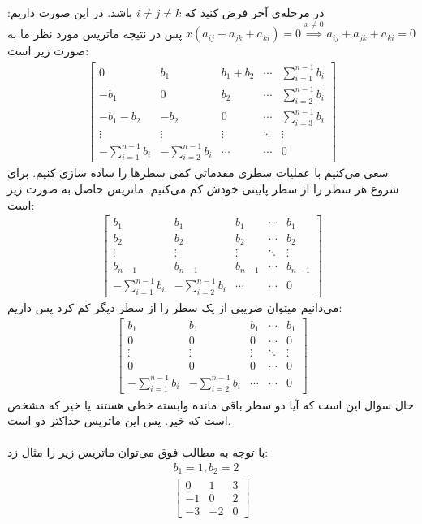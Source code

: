 \noindent
در مرحله‌ی آخر فرض کنید که
$i \neq j \neq k$
باشد. در این صورت داریم:
$x (a_{ij} + a_{jk} + a_{ki}) = 0 \stackrel{x \neq 0}{\implies} a_{ij} + a_{jk} + a_{ki} = 0$
پس در نتیجه ماتریس مورد نظر ما به صورت زیر است:
\begin{gather*}
    \begin{bmatrix}
        0 & b_1 & b_1 + b_2 & \cdots & \sum_{i=1}^{n-1} b_i \\
        -b_1 & 0 & b_2 & \cdots & \sum_{i=2}^{n-1} b_i\\
        -b_1 - b_2 & -b_2 & 0 & \cdots & \sum_{i=3}^{n-1} b_i\\
        \vdots & \vdots & \vdots & \ddots & \vdots\\
        -\sum_{i=1}^{n-1} b_i & -\sum_{i=2}^{n-1} b_i & \cdots & \cdots & 0
    \end{bmatrix}
\end{gather*}
سعی می‌کنیم با عملیات سطری مقدماتی کمی سطر‌ها را ساده سازی کنیم.
برای شروع هر سطر را از سطر پایینی خودش کم می‌کنیم. ماتریس حاصل به صورت زیر است:
\begin{gather*}
    \begin{bmatrix}
        b_1 & b_1 & b_1 & \cdots & b_1 \\
        b_2 & b_2 & b_2 & \cdots & b_2 \\
        \vdots & \vdots & \vdots & \ddots & \vdots\\
        b_{n-1} & b_{n-1} & b_{n-1} & \cdots & b_{n-1}\\
        -\sum_{i=1}^{n-1} b_i & -\sum_{i=2}^{n-1} b_i & \cdots & \cdots & 0
    \end{bmatrix}
\end{gather*}
می‌دانیم میتوان ضریبی از یک سطر را از سطر دیگر کم کرد پس داریم:
\begin{gather*}
    \begin{bmatrix}
        b_1 & b_1 & b_1 & \cdots & b_1 \\
        0 & 0 & 0 & \cdots & 0 \\
        \vdots & \vdots & \vdots & \ddots & \vdots\\
        0 & 0 & 0 & \cdots & 0\\
        -\sum_{i=1}^{n-1} b_i & -\sum_{i=2}^{n-1} b_i & \cdots & \cdots & 0
    \end{bmatrix}
\end{gather*}
حال سوال این است که آیا دو سطر باقی مانده وابسته خطی هستند یا خیر که مشخص است که خیر.
پس
این ماتریس حداکثر دو است.
\\\\
با توجه به مطالب فوق می‌توان ماتریس زیر را مثال زد:
\begin{gather*}
    b_1 = 1, b_2 = 2\\
    \begin{bmatrix}
        0 & 1 & 3\\
        -1 & 0 & 2\\
        -3 & -2 & 0
    \end{bmatrix}
\end{gather*}